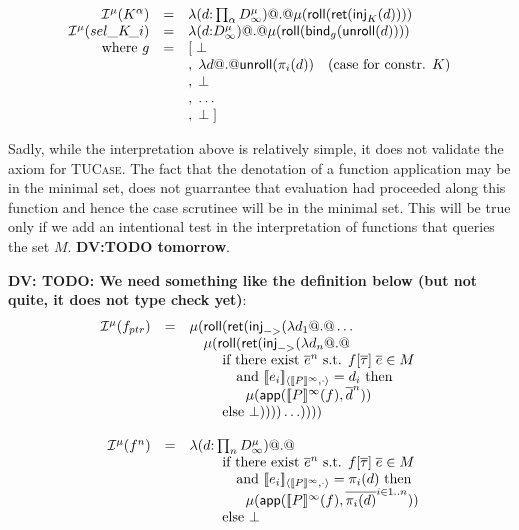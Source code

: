 \documentclass[preprint,nocopyrightspace,draft]{sigplanconf}
\begin{document}
\begin{itemize}
{\[\begin{array}{rcl}
   {\cal I}^\mu(K^{\alpha})     & = & \mathsf{\lambda} (d {:} \prod_{\alpha}D_{\infty}^\mu) @.@ \mu(\mathsf{roll}(\mathsf{ret}(\mathsf{inj}_{K}(d)))) \\ 
   {\cal I}^\mu(\mathop{sel\_K\!\_i}) & = & \mathsf{\lambda} (d {:} D_{\infty}^{\mu}) @.@ \mu(\mathsf{roll}(\mathsf{bind}_g(\mathsf{unroll}(d)))) \\ 
     \mbox{where } g  & = & [\;\bot \\ 
                      &   & ,\;\mathsf{\lambda} d @.@ \mathsf{unroll}(\pi_i(d))  \quad (\mbox{case for constr. } K) \\ 
                      &   & ,\;\bot \\ 
                      &   & ,\;\ldots\\ 
                      &   & ,\;\bot\; ]
  \end{array}\]}

  Sadly, while the interpretation above is relatively simple, it does not validate the axiom 
  for \textsc{TUCase}. The fact that the denotation of a function application may be in the minimal set, 
  does not guarrantee that evaluation had proceeded along this function and hence the case scrutinee will
  be in the minimal set. This will be true only if we add an intentional test in the interpretation of 
  functions that queries the set $M$. {\bf DV:TODO tomorrow}. 

  {\bf DV: TODO: We need something like the definition below (but not quite, it does not type check yet)}: 
  {\setlength{\arraycolsep}{2pt}  
  \[\begin{array}{rcl}
     \mlinterp{f_{ptr}} & = & \mu(\roll(\ret(\inj{->}(\dlambda d_1 @.@ \ldots  \\
                       &   & \quad \mu(\roll(\ret(\inj{->}(\dlambda d_n @.@ \\ 
                       &   & \quad\quad\text{ if there exist } \oln{e}{n} \text{ s.t. } f[\taus]\;\ol{e} \in M \\ 
                       &   & \quad\quad\quad\text{ and } \interp{e_i}{\dbrace{P}^\infty}{\cdot} = d_i\text{ then } \\
                       &   & \quad\quad\quad\quad \mu(\dapp(\dbrace{P}^{\infty}(f),\oln{d}{n})) \\ 
                       &   & \quad\quad\text{ else } \bot))))\ldots)))) \\ \\ 
   \mlinterp{f^{n}}  & = & \dlambda (d {:} \prod_{n}D_{\infty}^\mu) @.@  \\
                       &   & \quad\quad\text{ if there exist } \oln{e}{n} \text{ s.t. } f[\taus]\;\ol{e} \in M \\ 
                       &   & \quad\quad\quad\text{ and } \interp{e_i}{\dbrace{P}^\infty}{\cdot} = \pi_i(d)\text{ then } \\
                       &   & \quad\quad\quad\quad \mu(\dapp(\dbrace{P}^{\infty}(f),\oln{\pi_i(d)}{i \in 1..n})) \\
                       &   & \quad\quad\text{ else } \bot \\ \\ 


\end{array}\]}
\end{itemize}
\end{document}
